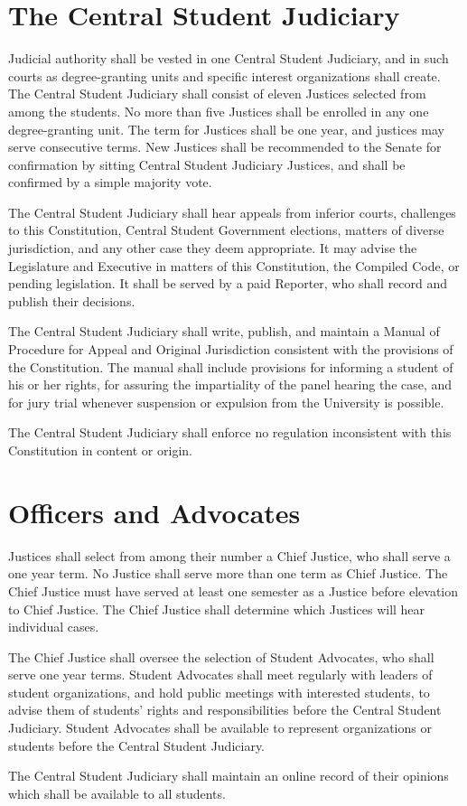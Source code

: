 
\section{The Central Student Judiciary}
    Judicial authority shall be vested in one Central Student Judiciary, and in such courts as degree-granting units and specific interest organizations shall create. The Central Student Judiciary shall consist of eleven Justices selected from among the students. No more than five Justices shall be enrolled in any one degree-granting unit. The term for Justices shall be one year, and justices may serve consecutive terms. New Justices shall be recommended to the Senate for confirmation by sitting Central Student Judiciary Justices, and shall be confirmed by a simple majority vote.

    The Central Student Judiciary shall hear appeals from inferior courts, challenges to this Constitution, Central Student Government elections, matters of diverse jurisdiction, and any other case they deem appropriate. It may advise the Legislature and Executive in matters of this Constitution, the Compiled Code, or pending legislation. It shall be served by a paid Reporter, who shall record and publish their decisions.

    The Central Student Judiciary shall write, publish, and maintain a Manual of Procedure for Appeal and Original Jurisdiction consistent with the provisions of the Constitution. The manual shall include provisions for informing a student of his or her rights, for assuring the impartiality of the panel hearing the case, and for jury trial whenever suspension or expulsion from the University is possible.

    The Central Student Judiciary shall enforce no regulation inconsistent with this Constitution in content or origin.


\section{Officers and Advocates}
    Justices shall select from among their number a Chief Justice, who shall serve a one year term. No Justice shall serve more than one term as Chief Justice. The Chief Justice must have served at least one semester as a Justice before elevation to Chief Justice. The Chief Justice shall determine which Justices will hear individual cases.

    The Chief Justice shall oversee the selection of  Student Advocates, who shall serve one year terms. Student Advocates shall meet regularly with leaders of student organizations, and hold public meetings with interested students, to advise them of students' rights and responsibilities before the Central Student Judiciary. Student Advocates shall be available to represent organizations or students before the Central Student Judiciary. 

    The Central Student Judiciary shall maintain an online record of their opinions which shall be available to all students.
